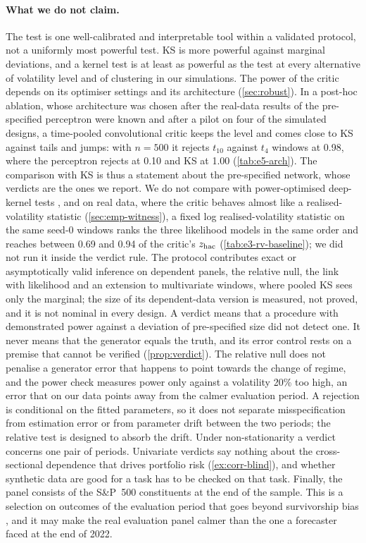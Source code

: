 \paragraph{What we do not claim.}
The \WC{} test is one well-calibrated and interpretable tool within a validated protocol, not a
uniformly most powerful test. KS is more powerful against marginal deviations, and a kernel test
is at least as powerful as the \WC{} test at every alternative of volatility level and of
clustering in our simulations. The power of the critic depends on its optimiser settings and its
architecture (\cref{sec:robust}). In a post-hoc ablation, whose architecture was chosen after the
real-data results of the pre-specified perceptron were known and after a pilot on four of the
simulated designs, a time-pooled convolutional critic keeps the level and comes close to KS
against tails and jumps: with $n=500$ it rejects $t_{10}$ against $t_4$ windows at 0.98, where the
perceptron rejects at 0.10 and KS at 1.00 (\cref{tab:e5-arch}). The comparison with KS is thus a
statement about the pre-specified network, whose verdicts are the ones we report. We do not
compare with power-optimised deep-kernel tests \citep{liu2020learning}, and on real data, where
the critic behaves almost like a realised-volatility statistic (\cref{sec:emp-witness}), a fixed
log realised-volatility statistic on the same seed-0 windows ranks the three likelihood models
in the same order and reaches between 0.69 and 0.94 of the critic's $z_{\mathrm{hac}}$
(\cref{tab:e3-rv-baseline}); we did not run it inside the verdict rule. The protocol contributes exact or asymptotically valid inference on
dependent panels, the relative null, the link with likelihood and an extension to multivariate
windows, where pooled KS sees only the marginal; the size of its dependent-data version is
measured, not proved, and it is not nominal in every design. A \GOOD{} verdict means that a
procedure with demonstrated power against a deviation of pre-specified size did not detect one. It
never means that the generator equals the truth, and its error control rests on a premise that
cannot be verified (\cref{prop:verdict}). The relative null does not penalise a generator error
that happens to point towards the change of regime, and the power check measures power only
against a volatility 20\% too high, an error that on our data points away from the calmer
evaluation period. A rejection is conditional on the fitted parameters, so
it does not separate misspecification from estimation error or from parameter drift between the
two periods; the relative test is designed to absorb the drift. Under non-stationarity a verdict
concerns one pair of periods. Univariate verdicts say nothing about the cross-sectional
dependence that drives portfolio risk (\cref{ex:corr-blind}), and whether synthetic data are good
for a task has to be checked on that task. Finally, the panel consists of the S\&P~500
constituents at the end of the sample. This is a selection on outcomes of the evaluation period
that goes beyond survivorship bias \citep{brown1992survivorship,shumway1997delisting}, and it may
make the real evaluation panel calmer than the one a forecaster faced at the end of 2022.

